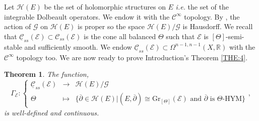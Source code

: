 \documentclass{article}
\newtheorem{theorem}{Theorem}[section]
\theoremstyle{remark}
\theoremstyle{definition}
\newcommand{\R}{\mathbb{R}}
\newcommand{\E}{\mathcal{E}}
\newcommand{\G}{\mathcal{G}}
\newcommand{\Gr}{\mathrm{Gr}}
\newcommand{\dbar}{\overline{\partial}}
\newcommand{\mC}{\mathcal{C}}
\newcommand{\fonction}[4]{\left\{ \begin{array}{rcl}
		\displaystyle #1 & \longrightarrow & \displaystyle #2\\
		\displaystyle #3 & \longmapsto & \displaystyle #4
	\end{array} \right.}
\begin{document}
Let $\mathcal{H}(E)$ be the set of holomorphic structures on $E$ \textit{i.e.} the set of the integrable Dolbeault operators. We endow it with the $\mC^\infty$ topology. By \cite[Corollary 7.1.15]{Kobayashi}, the action of $\G$ on $\mathcal{H}(E)$ is proper so the space $\mathcal{H}(E)/\G$ is Hausdorff. We recall that $\underline{\mC}_{ss}(\E) \subset \mC_{ss}(\E)$ is the cone all balanced $\Theta$ such that $\E$ is $[\Theta]$-semi-stable and sufficiently smooth. We endow $\underline{\mC}_{ss}(\E) \subset \Omega^{n - 1,n - 1}(X,\R)$ with the $\mC^\infty$ topology too. We are now ready to prove Introduction's Theorem \ref{THE:4}.

\begin{theorem}\label{THE:Gamma continue}
    The function,
    $$
    \Gamma_\E : \fonction{\underline{\mC}_{ss}(\E)}{\mathcal{H}(E)/\G}{\Theta}{\{\dbar \in \mathcal{H}(E)|(E,\dbar) \cong \Gr_{[\Theta]}(\E) \textrm{ and $\dbar$ is $\Theta$-HYM}\}},
    $$
    is well-defined and continuous.
\end{theorem}
\end{document}
